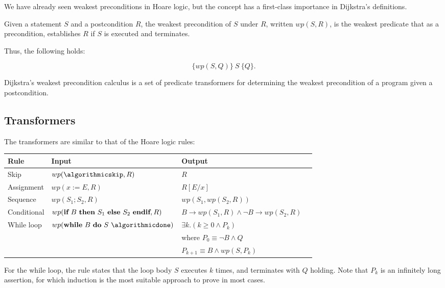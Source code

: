 We have already seen weakest preconditions in Hoare logic, but the concept has a first-class importance in Dijkstra's definitions.

\begin{definition}
Given a statement $S$ and a postcondition $R$, the weakest precondition of $S$ under $R$, written $wp(S, R)$, is the weakest predicate that as a precondition, establishes $R$ if $S$ is executed and terminates.
\end{definition}

Thus, the following holds:

\begin{displaymath}
\{ wp(S, Q) \}~ S ~\{Q\}.
\end{displaymath}

Dijkstra's weakest precondition calculus is a set of predicate transformers for determining the weakest precondition of a program given a postcondition.

\subsection{Transformers}

The transformers are similar to that of the Hoare logic rules:

\begin{tabular}{llll}
\toprule
\textbf{Rule} & \textbf{Input} & \textbf{Output}\\
\midrule
Skip &       $wp(\algorithmicskip, R)$  & $R$\\[2mm]
Assignment  & $wp(x := E, R)$ & $R[E/x]$\\[2mm]
Sequence    & $wp(S_1; S_2, R)$ & $wp(S_1, wp(S_2, R))$\\[2mm]
Conditional & $wp(\algorithmicif~B~\algorithmicthen~S_1 ~\algorithmicelse~ S_2 ~\algorithmicend\algorithmicif, R)$ & $B \rightarrow wp(S_1, R) \land \neg B \rightarrow wp(S_2, R)$\\[2mm]
While loop  & $wp(\algorithmicwhile~ B ~\algorithmicdo~ S ~\algorithmicdone)$
            & $\exists k . (k \geq 0 \land P_k)$\\
          & & where $P_0 \equiv \neg B \land Q$\\
          & & \quad\quad $P_{k+1} \equiv B \land wp(S, P_k)$\\
\bottomrule
\end{tabular}

For the while loop, the rule states that the loop body $S$ executes $k$ times, and terminates with $Q$ holding. Note that $P_k$ is an infinitely long assertion, for which induction is the most suitable approach to prove in most cases.

